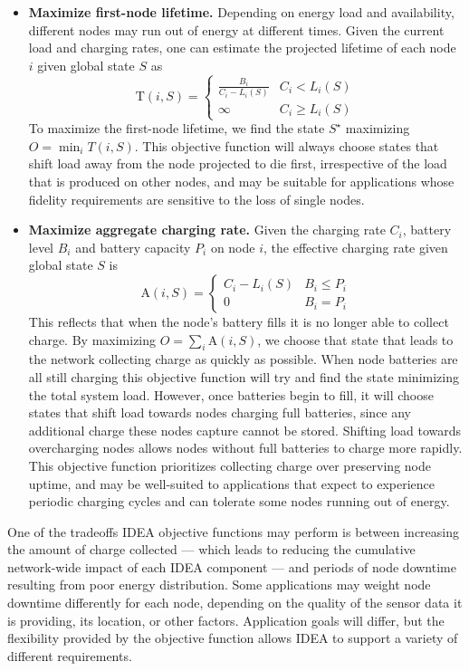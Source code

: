 \begin{itemize}

\item \textbf{Maximize first-node lifetime.} Depending on energy load and
availability, different nodes may run out of energy at different times. Given
the current load and charging rates, one can estimate the projected lifetime
of each node $i$ given global state $S$ as \[ \mathrm{T}(i,S) = \left\{
\begin{array}{lr} \frac{B_i}{C_i - L_i(S)} & C_i < L_i(S) \\ \infty & C_i \ge
L_i(S) \end{array} \right. \] To maximize the first-node lifetime, we find
the state $S^\star$ maximizing $O = \min_{i} T(i,S)$. This objective function
will always choose states that shift load away from the node projected to die
first, irrespective of the load that is produced on other nodes, and may be
suitable for applications whose fidelity requirements are sensitive to the
loss of single nodes.

\item \textbf{Maximize aggregate charging rate.} Given the charging rate
$C_i$, battery level $B_i$ and battery capacity $P_i$ on node $i$, the
effective charging rate given global state $S$ is \[\mathrm{A}(i,S) = \left\{
\begin{array}{lr} C_i - L_i(S) & B_i \le P_i \\ 0 & B_i = P_i \end{array}
\right. \] This reflects that when the node's battery fills it is no longer
able to collect charge. By maximizing $O = \sum_{i} \mathrm{A}(i,S)$, we
choose that state that leads to the network collecting charge as quickly as
possible. When node batteries are all still charging this objective function
will try and find the state minimizing the total system load. However, once
batteries begin to fill, it will choose states that shift load towards nodes
charging full batteries, since any additional charge these nodes capture
cannot be stored. Shifting load towards overcharging nodes allows nodes
without full batteries to charge more rapidly. This objective function
prioritizes collecting charge over preserving node uptime, and may be
well-suited to applications that expect to experience periodic charging
cycles and can tolerate some nodes running out of energy.

\end{itemize}

One of the tradeoffs IDEA objective functions may perform is between
increasing the amount of charge collected --- which leads to reducing the
cumulative network-wide impact of each IDEA component --- and periods of node
downtime resulting from poor energy distribution. Some applications may
weight node downtime differently for each node, depending on the quality of
the sensor data it is providing, its location, or other factors. Application
goals will differ, but the flexibility provided by the objective function
allows IDEA to support a variety of different requirements.


